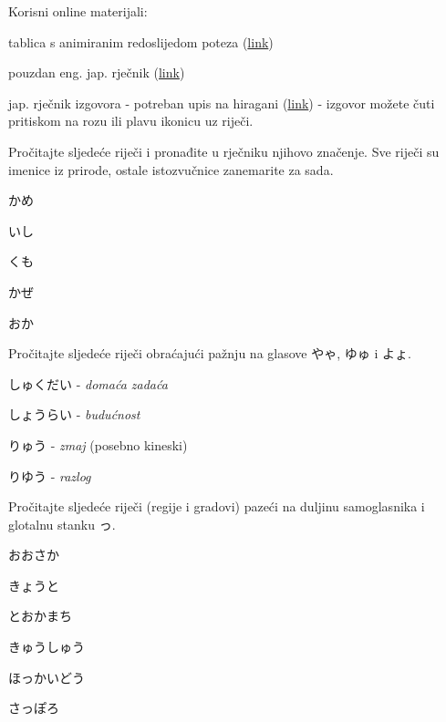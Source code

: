 
\author{autor}

	
	Korisni online materijali:
	\begin{hyou}
		\item tablica s animiranim redoslijedom poteza (\href{https://yosida.com/en/hiragana.html}{link})
		\item pouzdan eng. jap. rječnik (\href{https://jisho.org/}{link})
		\item jap. rječnik izgovora - potreban upis na hiragani (\href{http://www.gavo.t.u-tokyo.ac.jp/ojad/eng/search/index}{link}) - izgovor možete čuti pritiskom na rozu ili plavu ikonicu uz riječi.
	\end{hyou}
	
	\begin{mondai}{Pročitajte sljedeće riječi i pronađite u rječniku njihovo značenje. Sve riječi su imenice iz prirode, ostale istozvučnice zanemarite za sada.}
		\item かめ
		\item いし
		\item くも
		\item かぜ
		\item おか
	\end{mondai}

	\begin{mondai}{Pročitajte sljedeće riječi obraćajući pažnju na glasove やゃ, ゆゅ i よょ.}
		\item しゅくだい - \textit{domaća zadaća}
		\item しょうらい - \textit{budućnost}
		\item りゅう - \textit{zmaj} (posebno kineski)
		\item りゆう - \textit{razlog}
	\end{mondai}

	\begin{mondai}{Pročitajte sljedeće riječi (regije i gradovi) pazeći na duljinu samoglasnika i glotalnu stanku っ.}
		\item おおさか
		\item きょうと
		\item とおかまち
		\item きゅうしゅう
		\item ほっかいどう
		\item さっぽろ
	\end{mondai}

